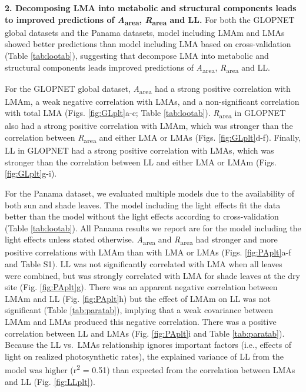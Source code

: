 \documentclass[
  12pt,
]{article}
\begin{document}
\textbf{2. Decomposing LMA into metabolic and structural components leads to improved predictions of \emph{A}\textsubscript{area}, \emph{R}\textsubscript{area} and LL.}
For both the GLOPNET global datasets and the Panama datasets, model including LMAm and LMAs showed better predictions than model including LMA based on cross-validation (Table \ref{tab:lootab}), suggesting that decompose LMA into metabolic and structural components leads improved predictions of \emph{A}\textsubscript{area}, \emph{R}\textsubscript{area} and LL.

For the GLOPNET global dataset, \emph{A}\textsubscript{area} had a strong positive correlation with LMAm, a weak negative correlation with LMAs, and a non-significant correlation with total LMA (Figs. \ref{fig:GLplt}a-c; Table \ref{tab:lootab}).
\emph{R}\textsubscript{area} in GLOPNET also had a strong positive correlation with LMAm, which was stronger than the correlation between \emph{R}\textsubscript{area} and either LMA or LMAs (Figs. \ref{fig:GLplt}d-f).
Finally, LL in GLOPNET had a strong positive correlation with LMAs, which was stronger than the correlation between LL and either LMA or LMAm (Figs. \ref{fig:GLplt}g-i).

For the Panama dataset, we evaluated multiple models due to the availability of both sun and shade leaves.
The model including the light effects fit the data better than the model without the light effects according to cross-validation (Table \ref{tab:lootab}).
All Panama results we report are for the model including the light effects unless stated otherwise.
\emph{A}\textsubscript{area} and \emph{R}\textsubscript{area} had stronger and more positive correlations with LMAm than with LMA or LMAs (Figs. \ref{fig:PAplt}a-f and Table S1).
LL was not significantly correlated with LMA when all leaves were combined, but was strongly correlated with LMA for shade leaves at the dry site (Fig. \ref{fig:PAplt}g).
There was an apparent negative correlation between LMAm and LL (Fig. \ref{fig:PAplt}h) but the effect of LMAm on LL was not significant (Table \ref{tab:paratab}), implying that a weak covariance between LMAm and LMAs produced this negative correlation.
There was a positive correlation between LL and LMAs (Fig. \ref{fig:PAplt}i and Table \ref{tab:paratab}).
Because the LL vs.~LMAs relationship ignores important factors (i.e., effects of light on realized photosynthetic rates), the explained variance of LL from the model was higher (r\textsuperscript{2} = 0.51) than expected from the correlation between LMAs and LL (Fig. \ref{fig:LLplt}).
\end{document}
